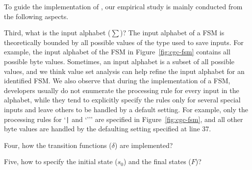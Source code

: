 

To guide the implementation of \Tool{}, our empirical study 
is mainly conducted from the following aspects. 




Third, what is the input alphabet ($\sum$)? 
The input alphabet of a FSM is theoretically bounded by all possible values 
of the type used to save inputs. 
For example, the input alphabet of the FSM 
in Figure~\ref{fig:cgc-fsm} 
contains all possible byte values.
Sometimes, an input alphabet is a subset of all possible values, 
and we think value set analysis can help refine the input alphabet for an 
identified FSM.
We also observe that during the implementation of a FSM, 
developers usually do not enumerate the processing rule for every 
input in the alphabet,
while they tend to explicitly specify the rules only for several special inputs
and leave others to be handled by a default setting. 
For example, only the processing rules for `\verb/|/ and `''' are specified in Figure~\ref{fig:cgc-fsm}, 
and all other byte values are handled by the defaulting setting specified at line 37. 

Four, how the transition functions ($\delta$) are implemented?

Five, how to specify the initial state ($s_0$) and the final states ($F$)? 